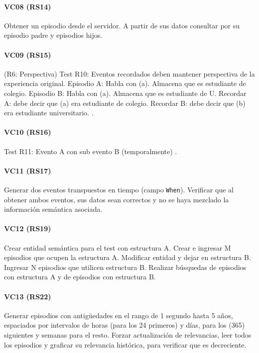 \paragraph{VC08 (RS14)}
Obtener un episodio desde el servidor. A partir de sus datos consultar por su episodio padre y episodios hijos.

\paragraph{VC09 (RS15)}
(R6: Perspectiva)
Test R10: Eventos recordados deben mantener perspectiva de la experiencia original.
Episodio A: Habla con (a). Almacena que es estudiante de colegio.
Episodio B: Habla con (a). Almacena que es estudiante de U.
Recordar A: debe decir que (a) era estudiante de colegio.
Recordar B: debe decir que (b) era estudiante universitario. 
.

\paragraph{VC10 (RS16)}
Test R11: Evento A con sub evento B (temporalmente)
.


\paragraph{VC11 (RS17)}
Generar dos eventos transpuestos en tiempo (campo \texttt{When}). Verificar que al obtener ambos eventos, sus datos sean correctos y no se haya mezclado la información semántica asociada.


\paragraph{VC12 (RS19)}
Crear entidad semántica para el test con estructura A. Crear e ingresar M episodios que ocupen la estructura A. Modificar entidad y dejar en estructura B. Ingresar N episodios que utilicen estructura B. Realizar búsquedas de episodios con estructura A y de episodios con estructura B.


\paragraph{VC13 (RS22)}
Generar episodios con antigüedades en el rango de 1 segundo hasta 5 años, espaciados por intervalos de horas (para los 24 primeros) y días, para los (365) siguientes y semanas para el resto. Forzar actualización de relevancias, leer todos los episodios y graficar su relevancia histórica, para verificar que es decreciente.

